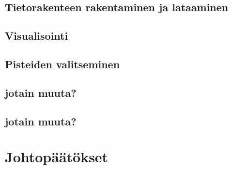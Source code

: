 \subsection{Tietorakenteen rakentaminen ja lataaminen}
\subsection{Visualisointi}
\subsection{Pisteiden valitseminen}
\subsection{jotain muuta?}
\subsection{jotain muuta?}



\section{Johtopäätökset}









\renewcommand{\baselinestretch}{1}\large\normalsize



\clearpage

%
%
%
%
%
%
%
